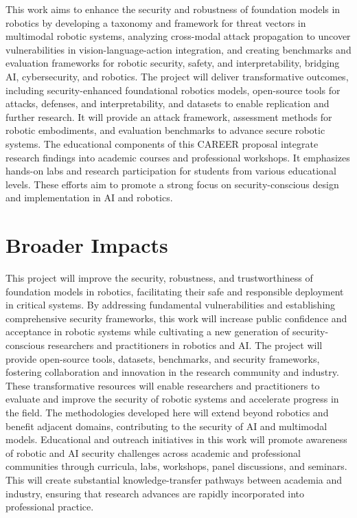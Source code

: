 This work aims to enhance the security and robustness of foundation models in robotics by  developing a taxonomy and framework for threat vectors in multimodal robotic systems,  analyzing cross-modal attack propagation to uncover vulnerabilities in vision-language-action integration, and  creating benchmarks and evaluation frameworks for robotic security, safety, and interpretability, bridging AI, cybersecurity, and robotics.
The project will deliver transformative outcomes, including security-enhanced foundational robotics models, open-source tools for attacks, defenses, and interpretability, and datasets to enable replication and further research. It will provide an attack framework, assessment methods for robotic embodiments, and evaluation benchmarks to advance secure robotic systems.
The educational components of this CAREER proposal integrate research findings into academic courses and professional workshops. It emphasizes hands-on labs and research participation for students from various educational levels. These efforts aim to promote a strong focus on security-conscious design and implementation in AI and robotics.


\section*{Broader Impacts}

This project will improve the security, robustness, and trustworthiness of foundation models in robotics, facilitating their safe and responsible deployment in critical systems. By addressing fundamental vulnerabilities and establishing comprehensive security frameworks, this work will increase public confidence and acceptance in robotic systems while cultivating a new generation of security-conscious researchers and practitioners in robotics and AI.
The project will provide open-source tools, datasets, benchmarks, and security frameworks, fostering collaboration and innovation in the research community and industry. These transformative resources will enable researchers and practitioners to evaluate and improve the security of robotic systems and accelerate progress in the field. The methodologies developed here will extend beyond robotics and benefit adjacent domains, contributing to the security of AI and multimodal models.
Educational and outreach initiatives in this work will promote awareness of robotic and AI security challenges across academic and professional communities through curricula, labs, workshops, panel discussions, and seminars.
This will create substantial knowledge-transfer pathways between academia and industry, ensuring that research advances are rapidly incorporated into professional practice.


